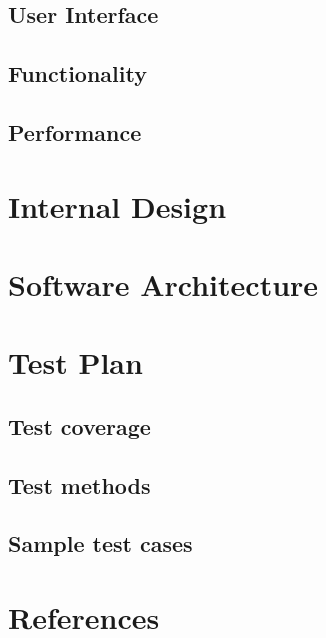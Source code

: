 \documentclass[a4paper,11pt]{article}
\begin{document}
  \subsection{User Interface}

  \subsection{Functionality}

  \subsection{Performance}

\section{Internal Design}

\section{Software Architecture}

\section{Test Plan}

  \subsection{Test coverage}

  \subsection{Test methods}

  \subsection{Sample test cases}

\section{References}
\end{document}
